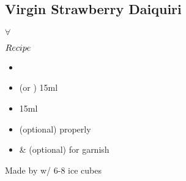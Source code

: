 \subsection{Virgin Strawberry Daiquiri}
\vspace{-8.mm}
\hspace{68mm}
$\forall$
\vspace{2.5mm}
\begin{itembox}[l]{\boldmath $Recipe$}
\begin{itemize}
\setlength{\parskip}{0cm}
\setlength{\itemsep}{0cm}
\item {}
\item \limj (or \lj) 15ml
\item \gumsyrup 15ml
\item \llsoda (optional) properly
\item \strawberry \& \mint (optional) for garnish
\end{itemize}
\vspace{-4mm}
Made by \blend w/ 6-8 ice cubes
\end{itembox}

